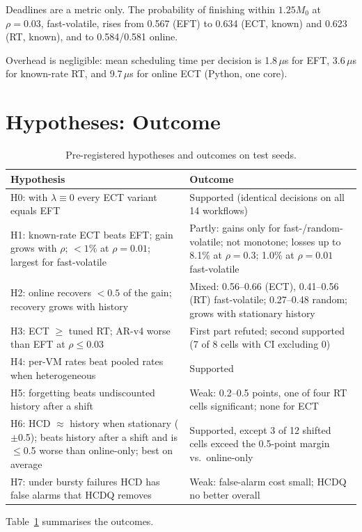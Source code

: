 \documentclass[conference]{IEEEtran}
\newcommand{\EFT}{\textsf{EFT}}
\newcommand{\ECT}{\textsf{ECT}}
\newcommand{\RT}{\textsf{RT}}
\begin{document}
Deadlines are a metric only. The probability of finishing within $1.25M_0$ at $\rho=0.03$, fast-volatile, rises from 0.567
(\EFT{}) to 0.634 (\ECT{}, known) and 0.623 (\RT{}, known), and to 0.584/0.581 online.

Overhead is negligible: mean scheduling time per decision is 1.8\,$\mu$s for \EFT{}, 3.6\,$\mu$s for known-rate \RT{}, and
9.7\,$\mu$s for online \ECT{} (Python, one core).



\section{Hypotheses: Outcome}
\begin{table}[t]\centering\scriptsize
\caption{Pre-registered hypotheses and outcomes on test seeds.}\label{tab:hyp}
\setlength{\tabcolsep}{3pt}
\begin{tabular}{p{}p{}}\toprule
Hypothesis & Outcome \\\midrule
H0: with $\lambda\equiv 0$ every ECT variant equals \EFT{} & Supported (identical decisions on all 14 workflows) \\
H1: known-rate \ECT{} beats \EFT{}; gain grows with $\rho$; $<1\%$ at $\rho=0.01$; largest for fast-volatile & Partly: gains only for fast-/random-volatile; not monotone; losses up to 8.1\% at $\rho=0.3$; 1.0\% at $\rho=0.01$ fast-volatile \\
H2: online recovers $<0.5$ of the gain; recovery grows with history & Mixed: 0.56--0.66 (\ECT{}), 0.41--0.56 (\RT{}) fast-volatile; 0.27--0.48 random; grows with stationary history \\
H3: \ECT{} $\geq$ tuned \RT{}; AR-v4 worse than \EFT{} at $\rho\le 0.03$ & First part refuted; second supported (7 of 8 cells with CI excluding 0) \\
H4: per-VM rates beat pooled rates when heterogeneous & Supported \\
H5: forgetting beats undiscounted history after a shift & Weak: 0.2--0.5 points, one of four \RT{} cells significant; none for \ECT{} \\
H6: \textsf{HCD} $\approx$ history when stationary ($\pm$0.5); beats history after a shift and is $\leq$0.5 worse than online-only; best on average & Supported, except 3 of 12 shifted cells exceed the 0.5-point margin vs.\ online-only \\
H7: under bursty failures \textsf{HCD} has false alarms that \textsf{HCDQ} removes & Weak: false-alarm cost small; \textsf{HCDQ} no better overall \\
\bottomrule\end{tabular}\end{table}
Table~\ref{tab:hyp} summarises the outcomes.
\end{document}
